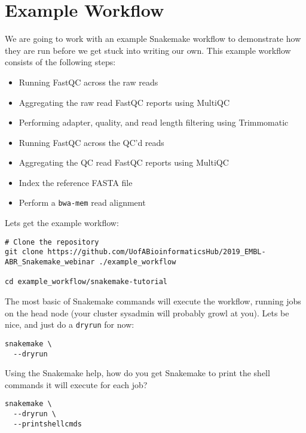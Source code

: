 \section{Example Workflow}

We are going to work with an example Snakemake workflow to demonstrate how they are run before
we get stuck into writing our own. This example workflow consists of the following steps:

\begin{itemize}
  \item Running FastQC across the raw reads
  \item Aggregating the raw read FastQC reports using MultiQC
  \item Performing adapter, quality, and read length filtering using Trimmomatic
  \item Running FastQC across the QC'd reads
  \item Aggregating the QC read FastQC reports using MultiQC
  \item Index the reference FASTA file
  \item Perform a \texttt{bwa-mem} read alignment
\end{itemize}

\begin{steps}

Lets get the example workflow:

\begin{lstlisting}
# Clone the repository
git clone https://github.com/UofABioinformaticsHub/2019_EMBL-ABR_Snakemake_webinar ./example_workflow

cd example_workflow/snakemake-tutorial
\end{lstlisting}

The most basic of Snakemake commands will execute the workflow, running jobs on the head node (your cluster
sysadmin will probably growl at you). Lets be nice, and just do a \texttt{dryrun} for now:

\begin{lstlisting}
snakemake \
  --dryrun
\end{lstlisting}
\end{steps}

\begin{questions}

Using the Snakemake help, how do you get Snakemake to print the shell commands it will execute for each job?

\begin{answer}
\begin{lstlisting}
snakemake \
  --dryrun \
  --printshellcmds
\end{lstlisting}
\end{answer}

\end{questions}

